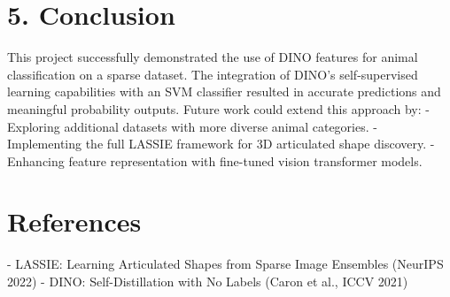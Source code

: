 \documentclass{article}%
\begin{document}
%
\section{5. Conclusion}%
\label{sec:5.Conclusion}%
This project successfully demonstrated the use of DINO features for animal classification on a sparse dataset. The integration of DINO's self{-}supervised learning capabilities with an SVM classifier resulted in accurate predictions and meaningful probability outputs. Future work could extend this approach by:\newline%
{-} Exploring additional datasets with more diverse animal categories.\newline%
{-} Implementing the full LASSIE framework for 3D articulated shape discovery.\newline%
{-} Enhancing feature representation with fine{-}tuned vision transformer models.

%
\section{References}%
\label{sec:References}%
{-} LASSIE: Learning Articulated Shapes from Sparse Image Ensembles (NeurIPS 2022)\newline%
{-} DINO: Self{-}Distillation with No Labels (Caron et al., ICCV 2021)

%
\end{document}

